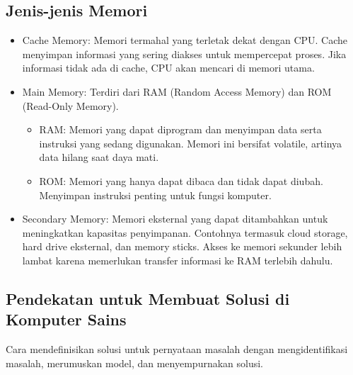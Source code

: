 \documentclass{article}
\begin{document}
\subsection{Jenis-jenis Memori}
\begin{itemize}
    \item Cache Memory: Memori termahal yang terletak dekat dengan CPU. Cache menyimpan informasi yang sering diakses untuk mempercepat proses. Jika informasi tidak ada di cache, CPU akan mencari di memori utama.
    \item Main Memory: Terdiri dari RAM (Random Access Memory) dan ROM (Read-Only Memory).

          \begin{itemize}
              \item RAM: Memori yang dapat diprogram dan menyimpan data serta instruksi yang sedang digunakan. Memori ini bersifat volatile, artinya data hilang saat daya mati.
              \item ROM: Memori yang hanya dapat dibaca dan tidak dapat diubah. Menyimpan instruksi penting untuk fungsi komputer.
          \end{itemize}
    \item Secondary Memory: Memori eksternal yang dapat ditambahkan untuk meningkatkan kapasitas penyimpanan. Contohnya termasuk cloud storage, hard drive eksternal, dan memory sticks. Akses ke memori sekunder lebih lambat karena memerlukan transfer informasi ke RAM terlebih dahulu.
\end{itemize}

\subsection{Pendekatan untuk Membuat Solusi di Komputer Sains}
Cara mendefinisikan solusi untuk pernyataan masalah dengan mengidentifikasi masalah, merumuskan model, dan menyempurnakan solusi.
\end{document}
